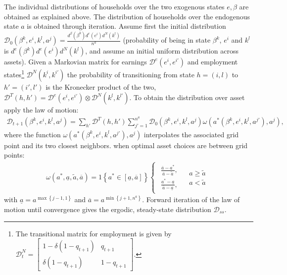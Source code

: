 The individual distributions of households over the two exogenous states $e,\beta$ are obtained as explained above. The distribution of households over the endogenous state $a$ is obtained through iteration. Assume first the initial distribution $\mathcal{D}_{0}\left(\beta^{k},e^{i},k^{l},a^{j}\right)=\frac{d^{\beta}\left(\beta^{k}\right)d^{e}\left(e^{i}\right)d^{N}\left(k^{l}\right)}{n^{a}}$ (probability of being in state $\beta^{k}$, $e^{i}$ and $k^{l}$ is $d^{e}\left(\beta^{k}\right)d^{e}\left(e^{i}\right)d^{N}\left(k^{l}\right)$, and assume an initial uniform distribution across assets). Given a Markovian matrix for earnings $\mathcal{D}^{e}\left(e^{i},e^{i'}\right)$ and employment states\footnote{The transitional matrix for employment is given by $\mathcal{D}_{t}^{N}=\left[\begin{array}{cc}
1-\delta\left(1-q_{t+1}\right) & q_{t+1}\\
\delta\left(1-q_{t+1}\right) & 1-q_{t+1}
\end{array}\right]$.} $\mathcal{D}^{N}\left(k^{i},k^{i'}\right)$ the probability of transitioning from state $h=\left(i,l\right)$ to $h'=\left(i',l'\right)$ is the Kronecker product of the two, $\mathcal{D}^{T}\left(h,h'\right)=\mathcal{D}^{e}\left(e^{i},e^{i'}\right)\otimes\mathcal{D}^{N}\left(k^{l},k^{l'}\right)$. To obtain the distribution over asset apply the law of motion:
\begin{gather*}
\mathcal{D}_{t+1}\left(\beta^{k},e^{i},k^{l},a^{j}\right)=\sum_{h'}\mathcal{D}^{T}\left(h,h'\right)\sum_{j'=1}^{n^{a}}\mathcal{D}_{0}\left(\beta^{k},e^{i},k^{l},a^{j}\right)\omega\left(a^{*}\left(\beta^{k},e^{i},k^{l},a^{j'}\right),a^{j}\right),  
\end{gather*}
where the function $\omega\left(a^{*}\left(\beta^{k},e^{i},k^{l},a^{j'}\right),a^{j}\right)$ interpolates the associated grid point and its two closest neighbors. when optimal asset choices are between grid points:
\begin{gather*}
\omega\left(a^{*},\underline{a},\tilde{a},\overline{a}\right)=1\left\{ a^{*}\in\left[\underline{a},\overline{a}\right]\right\} \begin{cases}
\begin{array}{c}
\frac{\overline{a}-a^{*}}{\overline{a}-\tilde{a}},\\
\frac{a^{*}-\underline{a}}{\overline{a}-\underline{a}},
\end{array} & \begin{array}{c}
a\geq\tilde{a}\\
a<\tilde{a}
\end{array}\end{cases}
\end{gather*}
with $\underline{a}=a^{\max\left\{ j-1,1\right\} }$ and $\overline{a}=a^{\min\left\{ j+1,n^{a}\right\} }$. Forward iteration of the law of motion until convergence gives the ergodic, steady-state distribution $\mathcal{D}_{ss}$. %
 



